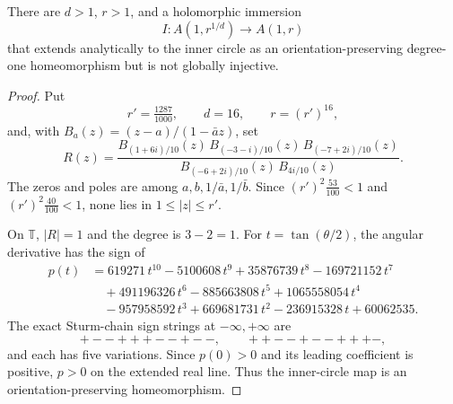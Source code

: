 \begin{theorem}\label{thm:kahn-annulus-no-go}
There are \(d>1\), \(r>1\), and a holomorphic immersion
\[
I:A(1,r^{1/d})\longrightarrow A(1,r)
\]
that extends analytically to the inner circle as an orientation-preserving degree-one homeomorphism but is not globally injective.
\end{theorem}

\begin{proof}
Put
\[
r'=\tfrac{1287}{1000},\qquad d=16,\qquad r=(r')^{16},
\]
and, with \(B_a(z)=(z-a)/(1-\bar a z)\), set
\[
R(z)=\frac{B_{(1+6i)/10}(z)\,B_{(-3-i)/10}(z)\,B_{(-7+2i)/10}(z)}{B_{(-6+2i)/10}(z)\,B_{4i/10}(z)}. \tag{10.35}
\]
The zeros and poles are among \(a,b,1/\bar a,1/\bar b\). Since \((r')^2\tfrac{53}{100}<1\) and \((r')^2\tfrac{40}{100}<1\), none lies in \(1\le|z|\le r'\).

On \(\mathbb T\), \(|R|=1\) and the degree is \(3-2=1\). For \(t=\tan(\theta/2)\), the angular derivative has the sign of
\begin{align*}
p(t)&=619271\,t^{10}-5100608\,t^{9}+35876739\,t^{8}-169721152\,t^{7}\\
&\quad+491196326\,t^{6}-885663808\,t^{5}+1065558054\,t^{4}\\
&\quad-957958592\,t^{3}+669681731\,t^{2}-236915328\,t+60062535 .
\end{align*}
The exact Sturm-chain sign strings at \(-\infty,+\infty\) are
\[
{+}{-}{-}{+}{+}{+}{-}{-}{+}{-}{-},\qquad {+}{+}{-}{-}{+}{-}{-}{+}{+}{+}{-},
\]
and each has five variations. Since \(p(0)>0\) and its leading coefficient is positive, \(p>0\) on the extended real line. Thus the inner-circle map is an orientation-preserving homeomorphism.


\end{proof}
